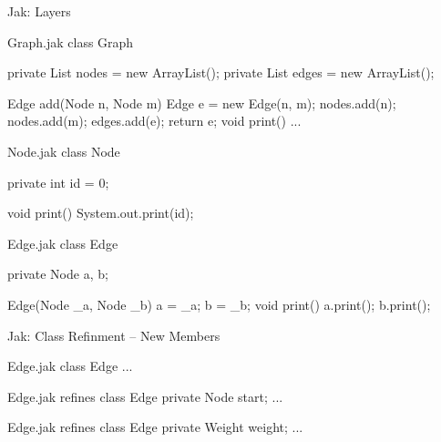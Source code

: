 \begin{frame}[fragile]{Jak: Layers}
	\begin{mycolumns}[widths={60,40},animation=none]
	\mynextcolumn
	\end{mycolumns}
	\begin{mycolumns}[columns=3,widths={43,27,30},animation=none]
\begin{codetight}{Graph.jak}
class Graph {
	private List nodes = new ArrayList();
	private List edges = new ArrayList();
	
	Edge add(Node n, Node m) {
		Edge e = new Edge(n, m);
		nodes.add(n); nodes.add(m); edges.add(e);
		return e;
	}
	void print() { ... }
}
\end{codetight}		
	\mynextcolumn
\begin{codetight}{Node.jak}
class Node {
	private int id = 0;

	void print() {
		System.out.print(id);
	}
}
\end{codetight}
	\mynextcolumn
\begin{codetight}{Edge.jak}
class Edge {
	private Node a, b;
	
	Edge(Node _a, Node _b) {
		a = _a; b = _b;
	}
	void print() {
		a.print(); b.print();
	}
}
\end{codetight}			
	\end{mycolumns}
\end{frame}

\begin{frame}[fragile]{Jak: Class Refinment – New Members}
	\begin{mycolumns}[widths={50,50},animation=none]
	\mynextcolumn
{\small
\begin{codetight}{Edge.jak}
class Edge {
	...
}
\end{codetight}
\begin{codetight}{Edge.jak}
refines class Edge {
	private Node start;
	...
}
\end{codetight}
\begin{codetight}{Edge.jak}
refines class Edge {
	private Weight weight;
	...
}
\end{codetight}
}
	\end{mycolumns}
\end{frame}

